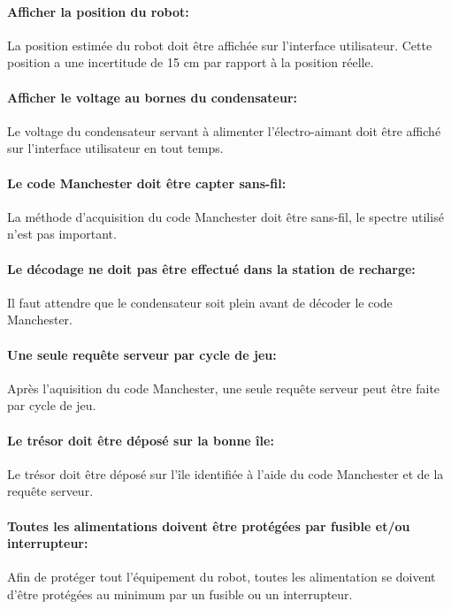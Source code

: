 \paragraph{Afficher la position du robot:}
La position estimée du robot doit être affichée sur l'interface utilisateur. Cette position a une incertitude de 15 cm par rapport à la position réelle.

\paragraph{Afficher le voltage au bornes du condensateur:}
Le voltage du condensateur servant à alimenter l'électro-aimant doit être affiché sur l'interface utilisateur en tout temps.

\paragraph{Le code Manchester doit être capter sans-fil:}
La méthode d'acquisition du code Manchester doit être sans-fil, le spectre utilisé n'est pas important.

\paragraph{Le décodage ne doit pas être effectué dans la station de recharge:}
Il faut attendre que le condensateur soit plein avant de décoder le code Manchester.

\paragraph{Une seule requête serveur par cycle de jeu:}
Après l'aquisition du code Manchester, une seule requête serveur peut être faite par cycle de jeu.

\paragraph{Le trésor doit être déposé sur la bonne île:}
Le trésor doit être déposé sur l'île identifiée à l'aide du code Manchester et de la requête serveur.

\paragraph{Toutes les alimentations doivent être protégées par fusible et/ou interrupteur:}
Afin de protéger tout l'équipement du robot, toutes les alimentation se doivent d'être protégées au minimum par un fusible ou un interrupteur.

